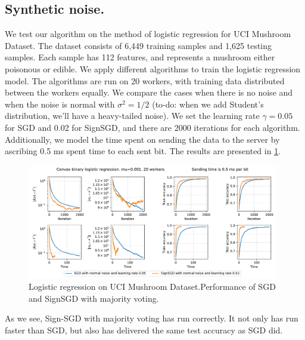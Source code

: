 \documentclass[12pt]{article}
\newcommand{\algname}[1]{{\sf  #1}\xspace}
\begin{document}
\subsection{Synthetic noise.}
We test our algorithm on the method of logistic regression for UCI Mushroom Dataset. The dataset consists of 6,449 training samples and 1,625 testing samples. Each sample has 112 features, and represents a mushroom either poisonous or edible. We apply different algorithms to train the logistic regression model. The algorithms are run on 20 workers, with training data distributed between the workers equally. We compare the cases when there is no noise and when the noise is normal with $\sigma^2 = 1/2$ (to-do: when we add Student's distribution, we'll have a heavy-tailed noise). We set the learning rate $\gamma = 0.05$ for \algname{SGD} and 0.02 for \algname{SignSGD}, and there are 2000 iterations for each algorithm. Additionally, we model the time spent on sending the data to the server by ascribing 0.5 ms spent time to each sent bit. The results are presented in \cref{fig:logreg}.
\begin{figure}[h]
    \centering
    \includegraphics[width=0.98\textwidth]{../figs/sgd_vs_sign_sgd.pdf}
    \caption{Logistic regression on UCI Mushroom Dataset.\newline Performance of SGD and SignSGD with majority voting.}
    \label{fig:logreg}
\end{figure}

As we see, Sign-SGD with majority voting has run correctly. It not only has run faster than SGD, but also has delivered the same test accuracy as SGD did.
\end{document}
